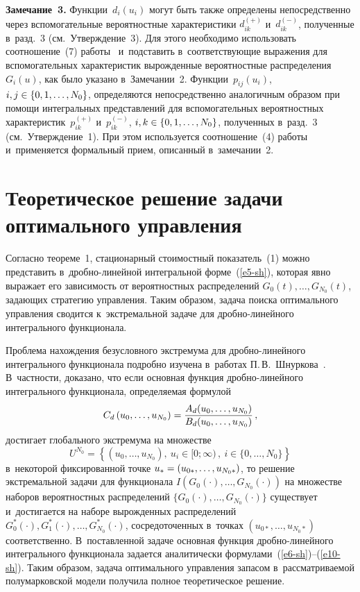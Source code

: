 \begin{multicols}{2}
  \noindent
  \textbf{Замечание~3.} Функции~$d_i(u_i)$ могут быть также определены 
непосредственно через вспомогательные вероятностные характеристики 
$d_{ik}^{(+)}$ и~$d_{ik}^{(-)}$, полученные в~разд.~3 (см.\ Утверж\-де\-ние~3). Для этого 
необходимо использовать соотношение~(7) работы~\cite{1-sh} и~под\-ста\-вить 
в~со\-от\-вет\-ст\-ву\-ющие выражения для вспомогательных характеристик 
вы\-рож\-ден\-ные вероятностные распределения~$G_i(u)$, как было указано 
в~Замечании~2. Функции~$p_{ij}(u_i)$, $i,j\hm\in \{0,1,\ldots , N_0\}$, 
определяются непосредственно аналогичным образом при помощи 
интегральных пред\-став\-ле\-ний для вспомогательных вероятностных 
характеристик~$p_{ik}^{(+)}$ и~$p_{ik}^{(-)}$, $i,k\hm\in \{0,1,\ldots ,N_0\}$, 
полученных в~разд.~3 (см.\ Утверж\-де\-ние~1). При этом используется 
соотношение~(4) работы~\cite{1-sh} и~применяется формальный прием, 
описанный в~замечании~2.

\vspace*{-6pt}
  
\section{Теоретическое решение задачи оптимального управления}

  Согласно тео\-ре\-ме~1, стационарный стоимостный показатель~(1) мож\-но 
пред\-ста\-вить в~дроб\-но-ли\-ней\-ной интегральной форме~(\ref{e5-sh}), которая 
явно выражает его за\-ви\-си\-мость от вероятностных распределений $G_0(t),\ldots , 
G_{N_0}(t)$, задающих стратегию управ\-ле\-ния. Таким образом, задача поиска 
оптимального управ\-ле\-ния сводится к~экстремальной задаче для  
дроб\-но-ли\-ней\-но\-го интегрального функционала. 
  
   Проблема нахождения безуслов\-но\-го экстремума для  
дроб\-но-ли\-ней\-но\-го интегрального функционала по\-дроб\-но изуче\-на 
в~работах П.\,В.~Шнур\-ко\-ва~\cite{8-sh, 9-sh}. В~част\-ности, доказано, что если 
основная функция дроб\-но-ли\-ней\-но\-го интегрального функционала, 
оп\-ре\-де\-ля\-емая формулой 
  \begin{equation}
  C_d\left( u_0, \ldots , u_{N_0}\right) =\displaystyle\frac{\displaystyle A_d(u_0,\ldots, u_{N_0})\mathstrut}{\displaystyle B_d(u_0,\ldots, u_{N_0})\mathstrut}\,,
  \label{e10-sh}
  \end{equation}
достигает глобального экстремума на множестве
$$
U^{N_0} =\left\{ \left( u_0, \ldots , u_{N_0}\right),\ u_i\in [0;\infty)\,,\ i\in 
\{0,\ldots , N_0\}\right\}
$$
в~некоторой фиксированной точ\-ке $u_*\hm=(u_{0*}, \ldots ,u_{N_0*})$, то 
решение экстремальной задачи для функционала $I(G_0(\cdot),\ldots 
,G_{N_0}(\cdot))$ на множестве наборов вероятностных распределений 
$\{G_0(\cdot), \ldots ,G_{N_0}(\cdot)\}$ существует и~достигается на наборе 
вы\-рож\-ден\-ных распределений $G_0^*(\cdot), G_1^*(\cdot), \ldots , 
G^*_{N_0}(\cdot)$, со\-сре\-до\-то\-чен\-ных в~точ\-ках $(u_{0*}, \ldots, u_{N_0*})$ 
соответственно. В~по\-став\-лен\-ной задаче основ\-ная функция  
дроб\-но-ли\-ней\-но\-го интегрального функционала задается аналитически 
формулами~(\ref{e6-sh})--(\ref{e10-sh}). Таким образом, задача оптимального 
управ\-ле\-ния запасом в~рас\-смат\-ри\-ва\-емой полумарковской модели 
получила пол\-ное тео\-ре\-ти\-че\-ское решение.


\end{multicols}
